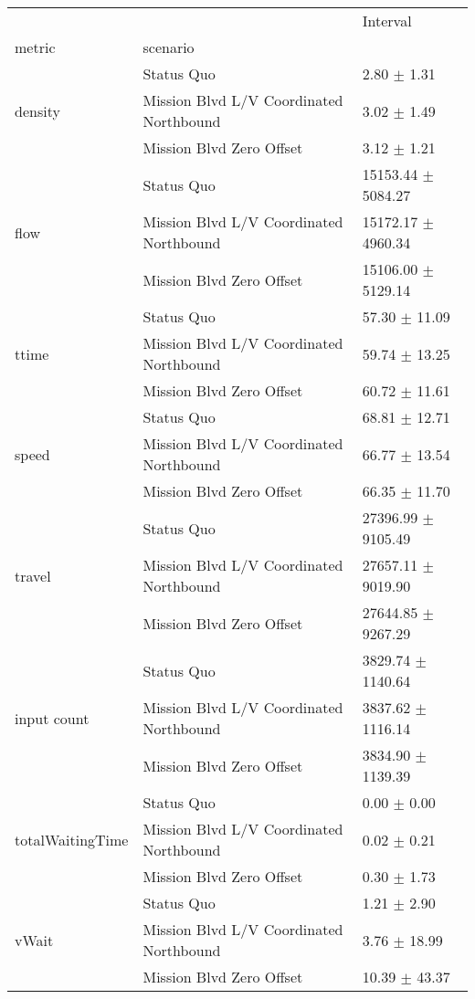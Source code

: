 \begin{tabular}{lll}
\toprule
 &  & Interval \\
metric & scenario &  \\
\midrule
\multirow[t]{3}{*}{density} & Status Quo & 2.80 $\pm$ 1.31 \\
 & Mission Blvd L/V Coordinated Northbound & 3.02 $\pm$ 1.49 \\
 & Mission Blvd Zero Offset & 3.12 $\pm$ 1.21 \\
\multirow[t]{3}{*}{flow} & Status Quo & 15153.44 $\pm$ 5084.27 \\
 & Mission Blvd L/V Coordinated Northbound & 15172.17 $\pm$ 4960.34 \\
 & Mission Blvd Zero Offset & 15106.00 $\pm$ 5129.14 \\
\multirow[t]{3}{*}{ttime} & Status Quo & 57.30 $\pm$ 11.09 \\
 & Mission Blvd L/V Coordinated Northbound & 59.74 $\pm$ 13.25 \\
 & Mission Blvd Zero Offset & 60.72 $\pm$ 11.61 \\
\multirow[t]{3}{*}{speed} & Status Quo & 68.81 $\pm$ 12.71 \\
 & Mission Blvd L/V Coordinated Northbound & 66.77 $\pm$ 13.54 \\
 & Mission Blvd Zero Offset & 66.35 $\pm$ 11.70 \\
\multirow[t]{3}{*}{travel} & Status Quo & 27396.99 $\pm$ 9105.49 \\
 & Mission Blvd L/V Coordinated Northbound & 27657.11 $\pm$ 9019.90 \\
 & Mission Blvd Zero Offset & 27644.85 $\pm$ 9267.29 \\
\multirow[t]{3}{*}{input count} & Status Quo & 3829.74 $\pm$ 1140.64 \\
 & Mission Blvd L/V Coordinated Northbound & 3837.62 $\pm$ 1116.14 \\
 & Mission Blvd Zero Offset & 3834.90 $\pm$ 1139.39 \\
\multirow[t]{3}{*}{totalWaitingTime} & Status Quo & 0.00 $\pm$ 0.00 \\
 & Mission Blvd L/V Coordinated Northbound & 0.02 $\pm$ 0.21 \\
 & Mission Blvd Zero Offset & 0.30 $\pm$ 1.73 \\
\multirow[t]{3}{*}{vWait} & Status Quo & 1.21 $\pm$ 2.90 \\
 & Mission Blvd L/V Coordinated Northbound & 3.76 $\pm$ 18.99 \\
 & Mission Blvd Zero Offset & 10.39 $\pm$ 43.37 \\
\bottomrule
\end{tabular}
